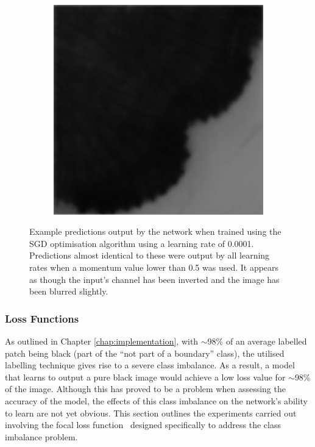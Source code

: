 \begin{figure}[t]
\begin{subfigure}[t]{0.32\textwidth}
    \end{subfigure}
    ~
    \begin{subfigure}[t]{0.32\textwidth}
        \centering
        \includegraphics[width=1\textwidth, valign=c]{images/sgd3.png}
    \end{subfigure}
    \caption{Example predictions output by the network when trained using the SGD optimisation algorithm using a learning rate of 0.0001. Predictions almost identical to these were output by all learning rates when a momentum value lower than 0.5 was used. It appears as though the input's channel has been inverted and the image has been blurred slightly.}
    \label{fig:sgdpredictions}
\end{figure}

\subsubsection{Loss Functions}

As outlined in Chapter \ref{chap:implementation}, with ${\sim}$98\% of an average labelled patch being black (part of the ``not part of a boundary'' class), the utilised labelling technique gives rise to a severe class imbalance. As a result, a model that learns to output a pure black image would achieve a low loss value for ${\sim}$98\% of the image. Although this has proved to be a problem when assessing the accuracy of the model, the effects of this class imbalance on the network's ability to learn are not yet obvious. This section outlines the experiments carried out involving the focal loss function~\cite{focalloss} designed specifically to address the class imbalance problem.


